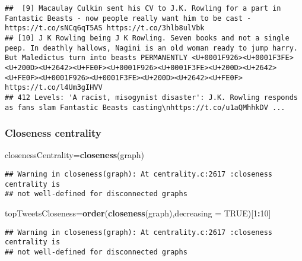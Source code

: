\documentclass[]{article}
\newenvironment{Shaded}{\begin{snugshade}}{\end{snugshade}}
\newcommand{\KeywordTok}[1]{\textcolor[rgb]{0.13,0.29,0.53}{\textbf{#1}}}
\newcommand{\DataTypeTok}[1]{\textcolor[rgb]{0.13,0.29,0.53}{#1}}
\newcommand{\DecValTok}[1]{\textcolor[rgb]{0.00,0.00,0.81}{#1}}
\newcommand{\OtherTok}[1]{\textcolor[rgb]{0.56,0.35,0.01}{#1}}
\newcommand{\OperatorTok}[1]{\textcolor[rgb]{0.81,0.36,0.00}{\textbf{#1}}}
\newcommand{\NormalTok}[1]{#1}
\begin{document}
\begin{verbatim}
##  [9] Macaulay Culkin sent his CV to J.K. Rowling for a part in Fantastic Beasts - now people really want him to be cast - https://t.co/sNCq6qT5AS https://t.co/3hlb8ulVbk                                                                                                                                                                                  
## [10] J K Rowling being J K Rowling. Seven books and not a single peep. In deathly hallows, Nagini is an old woman ready to jump harry. But Maledictus turn into beasts PERMANENTLY <U+0001F926><U+0001F3FE><U+200D><U+2642><U+FE0F><U+0001F926><U+0001F3FE><U+200D><U+2642><U+FE0F><U+0001F926><U+0001F3FE><U+200D><U+2642><U+FE0F> https://t.co/l4Um3gIHVV
## 412 Levels: 'A racist, misogynist disaster': J.K. Rowling responds as fans slam Fantastic Beasts casting\nhttps://t.co/u1aQMhhkDV ...
\end{verbatim}

\subsubsection{Closeness centrality}\label{closeness-centrality}

\begin{Shaded}
\begin{Highlighting}[]
\NormalTok{closenessCentrality=}\KeywordTok{closeness}\NormalTok{(graph)}
\end{Highlighting}
\end{Shaded}

\begin{verbatim}
## Warning in closeness(graph): At centrality.c:2617 :closeness centrality is
## not well-defined for disconnected graphs
\end{verbatim}

\begin{Shaded}
\begin{Highlighting}[]
\NormalTok{topTweetsCloseness=}\KeywordTok{order}\NormalTok{(}\KeywordTok{closeness}\NormalTok{(graph),}\DataTypeTok{decreasing =} \OtherTok{TRUE}\NormalTok{)[}\DecValTok{1}\OperatorTok{:}\DecValTok{10}\NormalTok{]}
\end{Highlighting}
\end{Shaded}

\begin{verbatim}
## Warning in closeness(graph): At centrality.c:2617 :closeness centrality is
## not well-defined for disconnected graphs
\end{verbatim}

\begin{Shaded}
\end{Shaded}
\end{document}
